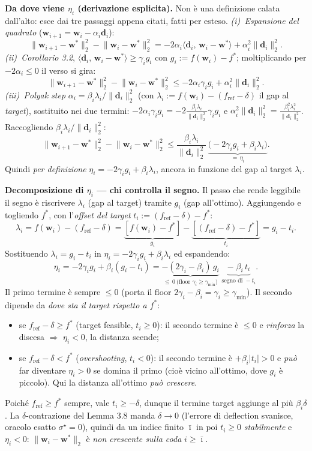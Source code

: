 \documentclass[11pt,a4paper]{article}
\theoremstyle{definition}
\newcommand{\w}{\bm{w}}
\newcommand{\dvec}{\bm{d}}
\newcommand{\wstar}{\w^{*}}
\newcommand{\fstar}{f^{*}}
\newcommand{\fref}{f_{\mathrm{ref}}}
\newcommand{\gmin}{\gamma_{\min}}
\newcommand{\inner}[2]{\langle #1,\, #2\rangle}
\newcommand{\norm}[1]{\lVert #1\rVert}
\begin{document}
\textbf{Da dove viene $\eta_i$ (derivazione esplicita).} Non è una definizione calata
dall'alto: esce dai tre passaggi appena citati, fatti per esteso. \emph{(i)~Espansione del
quadrato} ($\w_{i+1}=\w_i-\alpha_i\dvec_i$):
\[
\norm{\w_{i+1}-\wstar}_2^2-\norm{\w_i-\wstar}_2^2 = -2\alpha_i\inner{\dvec_i}{\w_i-\wstar}+\alpha_i^2\norm{\dvec_i}_2^2 .
\]
\emph{(ii)~Corollario 3.2}, $\inner{\dvec_i}{\w_i-\wstar}\ge\gamma_i g_i$ con $g_i:=f(\w_i)-\fstar$;
moltiplicando per $-2\alpha_i\le0$ il verso si gira:
\[
\norm{\w_{i+1}-\wstar}_2^2-\norm{\w_i-\wstar}_2^2 \le -2\alpha_i\gamma_i g_i+\alpha_i^2\norm{\dvec_i}_2^2 .
\]
\emph{(iii)~Polyak step} $\alpha_i=\beta_i\lambda_i/\norm{\dvec_i}_2^2$ (con
$\lambda_i:=f(\w_i)-(\fref-\delta)$ il gap al \emph{target}), sostituito nei due termini:
$-2\alpha_i\gamma_i g_i=-2\frac{\beta_i\lambda_i}{\norm{\dvec_i}_2^2}\gamma_i g_i$ e
$\alpha_i^2\norm{\dvec_i}_2^2=\frac{\beta_i^2\lambda_i^2}{\norm{\dvec_i}_2^2}$. Raccogliendo
$\beta_i\lambda_i/\norm{\dvec_i}_2^2$:
\[
\norm{\w_{i+1}-\wstar}_2^2-\norm{\w_i-\wstar}_2^2 \le \frac{\beta_i\lambda_i}{\norm{\dvec_i}_2^2}\,\underbrace{\big(-2\gamma_i g_i+\beta_i\lambda_i\big)}_{=\,\eta_i}.
\]
Quindi \emph{per definizione} $\eta_i=-2\gamma_i g_i+\beta_i\lambda_i$, ancora in funzione del
gap al target $\lambda_i$.

\textbf{Decomposizione di $\eta_i$ --- chi controlla il segno.} Il passo che rende leggibile il
segno è riscrivere $\lambda_i$ (gap al target) tramite $g_i$ (gap all'ottimo). Aggiungendo e
togliendo $\fstar$, con l'\emph{offset del target} $t_i:=(\fref-\delta)-\fstar$:
\[
\lambda_i=f(\w_i)-(\fref-\delta)=\underbrace{[f(\w_i)-\fstar]}_{g_i}-\underbrace{[(\fref-\delta)-\fstar]}_{t_i}=g_i-t_i .
\]
Sostituendo $\lambda_i=g_i-t_i$ in $\eta_i=-2\gamma_i g_i+\beta_i\lambda_i$ ed espandendo:
\[
\eta_i=-2\gamma_i g_i+\beta_i(g_i-t_i) = \underbrace{-(2\gamma_i-\beta_i)\,g_i}_{\le\,0\ \text{(floor }\gamma_i\ge\gmin)} \;\underbrace{-\;\beta_i\,t_i}_{\text{segno di }-t_i}.
\]
Il primo termine è sempre $\le0$ (porta il floor $2\gamma_i-\beta_i=\gamma_i\ge\gmin$). Il
secondo dipende da \emph{dove sta il target rispetto a $\fstar$}:
\begin{itemize}[leftmargin=1.4em]
\item se $\fref-\delta\ge\fstar$ (target feasible, $t_i\ge0$): il secondo termine è $\le0$ e
\emph{rinforza} la discesa $\Rightarrow$ $\eta_i<0$, la distanza scende;
\item se $\fref-\delta<\fstar$ (\emph{overshooting}, $t_i<0$): il secondo termine è $+\beta_i|t_i|>0$
e \emph{può} far diventare $\eta_i>0$ se domina il primo (cioè vicino all'ottimo, dove $g_i$ è
piccolo). Qui la distanza all'ottimo \emph{può crescere}.
\end{itemize}
Poiché $\fref\ge\fstar$ sempre, vale $t_i\ge-\delta$, dunque il termine target aggiunge al più
$\beta_i\delta$. La $\delta$-contrazione del Lemma 3.8 manda $\delta\to0$ (l'errore di
deflection svanisce, oracolo esatto $\sigma^\star=0$), quindi da un indice finito $\bar\imath$
in poi $t_i\ge0$ \emph{stabilmente} e $\eta_i<0$: $\norm{\w_i-\wstar}_2$ è \emph{non crescente
sulla coda} $i\ge\bar\imath$.
\end{document}
